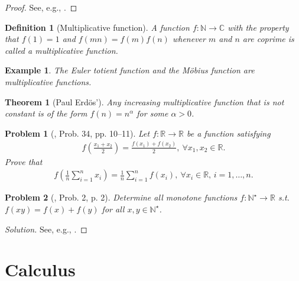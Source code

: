 \documentclass[oneside]{book}
\numberwithin{equation}{section}
\newtheorem{definition}{Definition}[section]
\newtheorem{example}{Example}[section]
\newtheorem{problem}{Problem}[section]
\newtheorem{theorem}{Theorem}[section]
\begin{document}
\begin{proof}[Proof]
	See, e.g., \cite[p. 8]{Gelca_Andreescu2017}.
\end{proof}

\begin{definition}[Multiplicative function]
	A function $f:\mathbb{N}\to\mathbb{C}$ with the property that $f(1) = 1$ and $f(mn) = f(m)f(n)$ whenever $m$ and $n$ are coprime is called a \emph{multiplicative function}.
\end{definition}

\begin{example}
	The \emph{Euler totient function} and the \emph{M\"obius function} are multiplicative functions.
\end{example}

\begin{theorem}[Paul Erd\"os']
	Any increasing multiplicative function that is not constant is of the form $f(n) = n^\alpha$ for some $\alpha > 0$.
\end{theorem}

\begin{problem}[\cite{Gelca_Andreescu2017}, Prob. 34, pp. 10--11]
	Let $f:\mathbb{R}\to\mathbb{R}$ be a function satisfying
	\begin{align*}
		f\left(\frac{x_1 + x_2}{2}\right) = \frac{f(x_1) + f(x_2)}{2},\ \forall x_1,x_2\in\mathbb{R}.
	\end{align*}
	Prove that
	\begin{align*}
		f\left(\frac{1}{n}\sum_{i=1}^n x_i\right) = \frac{1}{n}\sum_{i=1}^n f(x_i),\ \forall x_i\in\mathbb{R},\,i = 1,\ldots,n.
	\end{align*}
\end{problem}

\begin{problem}[\cite{Andreescu_Mortici_Tetiva2017}, Prob. 2, p. 2]
	Determine all monotone functions $f:\mathbb{N}^\star\to\mathbb{R}$ s.t. $f(xy) = f(x) + f(y)$ for all $x,y\in\mathbb{N}^\star$.
\end{problem}

\begin{proof}[Solution]
	See, e.g., \cite[pp. 2--3]{Andreescu_Mortici_Tetiva2017}.
\end{proof}


\part{Calculus}
\end{document}
